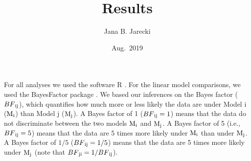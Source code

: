 \documentclass[]{standalone}
\title{Results}
\author{Jana B. Jarecki}
\date{Aug.~2019}
\begin{document}
\maketitle

For all analyses we used the software R \citep{R2019}. For the linear
model comparisons, we used the BayesFactor package \citep{BayesFactor}.
We based our inferences on the Bayes factor (\(BF\textsubscript{ij}\)),
which quantifies how much more or less likely the data are under Model i
(\(\mathrm{M}\textsubscript{i}\)) than Model j
(\(\mathrm{M}\textsubscript{j}\)). A Bayes factor of 1
(\(BF\textsubscript{ij} = 1\)) means that the data do not discriminate
between the two models \(\mathrm{M}\textsubscript{i}\) and
\(\mathrm{M}\textsubscript{j}\). A Bayes factor of 5 (i.e.,
\(BF\textsubscript{ij} = 5\)) means that the data are 5 times more
likely under \(\mathrm{M}\textsubscript{i}\) than under
\(\mathrm{M}\textsubscript{j}\). A Bayes factor of \(1/5\)
(\(BF\textsubscript{ij} = 1/5\)) means that the data are 5 times more
likely under \(\mathrm{M}\textsubscript{j}\) (note that
\(BF\textsubscript{ji} = 1/BF\textsubscript{ij}\)).
\end{document}

